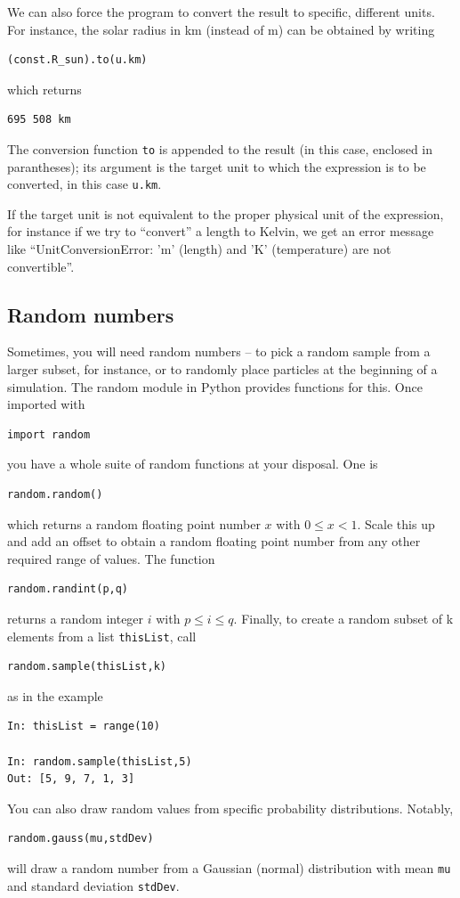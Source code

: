 \documentclass[twocolumn,apj]{openjournal}
\begin{document}
We can also force the program to convert the result to specific, different units. For instance, the solar radius in km (instead of m) can be obtained by writing
\begin{lstlisting}
(const.R_sun).to(u.km)
\end{lstlisting}
which returns
\begin{lstlisting}
695 508 km
\end{lstlisting}
The conversion function \verb|to| is appended to the result (in this case, enclosed in parantheses); its argument is the target unit to which the expression is to be converted, in this case \verb|u.km|.

If the target unit is not equivalent to the proper physical unit of the expression, for instance if we try to ``convert'' a length to Kelvin, we get an error message like ``UnitConversionError: 'm' (length) and 'K' (temperature) are not convertible''.

\subsection{Random numbers}
\label{Random}

Sometimes, you will need random numbers -- to pick a random sample from a larger subset, for instance, or to randomly place particles at the beginning of a simulation. The random module in Python provides functions for this. Once imported with
\begin{lstlisting}
import random
\end{lstlisting}
you have a whole suite of random functions at your disposal. One is
\begin{lstlisting}
random.random()
\end{lstlisting}
which returns a random floating point number $x$ with $0\le x <1$. Scale this up and add an offset to obtain a random floating point number from any other required range of values. The function
\begin{lstlisting}
random.randint(p,q)
\end{lstlisting}
returns a random integer $i$ with $p\le i\le q$. Finally, to create a random subset of k elements from a list \verb|thisList|, call
\begin{lstlisting}
random.sample(thisList,k)
\end{lstlisting}
as in the example
\begin{lstlisting}
In: thisList = range(10)

In: random.sample(thisList,5)
Out: [5, 9, 7, 1, 3]
\end{lstlisting}
You can also draw random values from specific probability distributions. Notably,
\begin{lstlisting}
random.gauss(mu,stdDev)
\end{lstlisting}
will draw a random number from a Gaussian (normal) distribution with mean \verb|mu| and standard deviation \verb|stdDev|.
\end{document}

